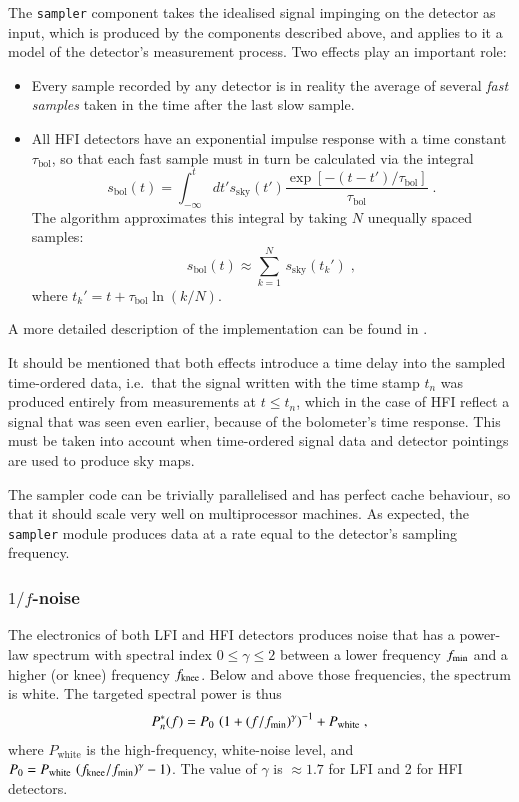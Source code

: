 \documentclass{aa}
\begin{document}
The {\tt sampler} component takes the idealised signal
impinging on the detector as input, which is produced by the components
described above, and applies to it a model of the detector's
measurement process. Two effects play an important role:
\begin{itemize}
  \item Every sample recorded by any detector is in reality the
    average of several \emph{fast samples} taken in the time after the
    last slow sample.
  \item All HFI detectors have an exponential impulse response with a
    time constant $\tau_{\text{bol}}$, so that each fast sample must
    in turn be calculated via the integral
    \begin{equation}
      s_{\text{bol}}(t)=\int_{-\infty}^t dt' s_{\text{sky}}(t')
      \frac{\exp [-(t-t')/\tau_{\text{bol}}]}{\tau_{\text{bol}}}\;.
    \end{equation}
    The algorithm approximates this integral by taking $N$ unequally
    spaced samples:
    \begin{equation}
     s_{\text{bol}}(t)\approx\sum_{k=1}^{N}\,s_{\text{sky}}(t_k')\;,
    \end{equation}
    where $t_k'=t+\tau_{\text{bol}}\ln(k/N)$.
\end{itemize}
A more detailed description of the implementation can be found in
\cite{grivell-mann-1999}.

It should be mentioned that both effects introduce a time delay into
the sampled time-ordered data, i.e.\ that the signal written with the
time stamp $t_n$ was produced entirely from measurements at $t\le t_n$,
which in the case of HFI reflect a signal that was seen even earlier,
because of the bolometer's time response. This must be taken into
account when time-ordered signal data and detector pointings are used
to produce sky maps.

The sampler code can be trivially parallelised and has perfect cache
behaviour, so that it should scale very well on multiprocessor
machines. As expected, the {\tt sampler} module produces data at a rate equal
to the detector's sampling frequency.

\subsubsection {$1/f$-noise}
\label{oofnoise}

The electronics of both LFI and HFI detectors produces noise that has
a power-law spectrum with spectral index $0\le \gamma \le2$ between a
lower frequency $f_{\rm min}$ and a higher (or knee) frequency $f_{\rm
knee}$. Below and above those frequencies, the spectrum is white.
The targeted spectral power is thus
\begin{equation}
\label{eq:targetnoise}
  P_n^*(f)=P_0\,\left(1+ (f/f_{\rm min})^\gamma\right)^{-1}+P_{\text{white}}\;,
\end{equation}
where $P_{\text{white}}$ is the high-frequency, white-noise level, and
$P_0=P_{\text{white}}\,\left(f_{\rm knee}/f_{\rm min})^\gamma-1\right)$.  The
value of $\gamma$ is $\approx 1.7$ for LFI and 2 for HFI detectors.
\end{document}
